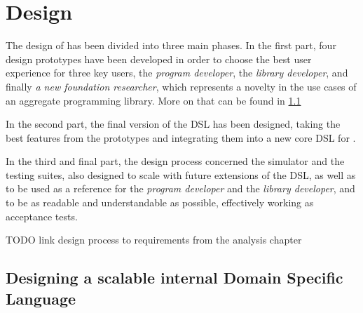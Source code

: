 \chapter{Design}
\label{chap:design}
The design of \this has been divided into three main phases.
%
In the first part, four design prototypes have been developed in order to choose the best user experience for three key users, the \textit{program developer}, the \textit{library developer}, and finally \textit{a new foundation researcher}, which represents a novelty in the use cases of an aggregate programming library.
%
More on that can be found in \cref{chap:design->sec:dsl}

In the second part, the final version of the \ac{DSL} has been designed, taking the best features from the prototypes and integrating them into a new core \ac{DSL} for \this.

In the third and final part, the design process concerned the simulator and the testing suites, also designed to scale with future extensions of the \ac{DSL}, as well as to be used as a reference for the \textit{program developer} and the \textit{library developer}, and to be as readable and understandable as possible, effectively working as acceptance tests.

TODO link design process to requirements from the analysis chapter

\section{Designing a scalable internal Domain Specific Language} \label{chap:design->sec:dsl}

